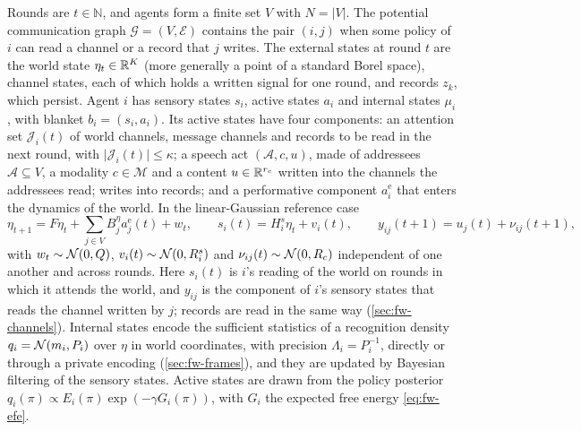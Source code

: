 \begin{definition}\label{def:fw-system}
Rounds are $t\in\mathbb N$, and agents form a finite set $V$ with $N=\lvert V\rvert$. The potential communication graph $\mathcal G=(V,\mathcal E)$ contains the pair $(i,j)$ when some policy of $i$ can read a channel or a record that $j$ writes. The external states at round $t$ are the world state $\eta_t\in\mathbb{R}^K$ (more generally a point of a standard Borel space), channel states, each of which holds a written signal for one round, and records $z_k$, which persist. Agent $i$ has sensory states $s_i$, active states $a_i$ and internal states $\mu_i$, with blanket $b_i=(s_i,a_i)$. Its active states have four components: an attention set $\mathcal J_i(t)$ of world channels, message channels and records to be read in the next round, with $\lvert\mathcal J_i(t)\rvert\le\kappa$; a speech act $(\mathcal A,c,u)$, made of addressees $\mathcal A\subseteq V$, a modality $c\in\mathcal M$ and a content $u\in\mathbb{R}^{r_c}$ written into the channels the addressees read; writes into records; and a performative component $a^{\mathrm e}_i$ that enters the dynamics of the world. In the linear-Gaussian reference case
\begin{equation}\label{eq:fw-world}
\eta_{t+1}=F\eta_t+\sum_{j\in V}B^\eta_ja^{\mathrm e}_j(t)+w_t,\qquad s_i(t)=H^s_i\eta_t+v_i(t),\qquad y_{ij}(t+1)=u_j(t)+\nu_{ij}(t+1),
\end{equation}
with $w_t\sim\mathcal{N}(0,Q)$, $v_i(t)\sim\mathcal{N}(0,R^s_i)$ and $\nu_{ij}(t)\sim\mathcal{N}(0,R_c)$ independent of one another and across rounds. Here $s_i(t)$ is $i$'s reading of the world on rounds in which it attends the world, and $y_{ij}$ is the component of $i$'s sensory states that reads the channel written by $j$; records are read in the same way (\cref{sec:fw-channels}). Internal states encode the sufficient statistics of a recognition density $q_i=\mathcal{N}(m_i,P_i)$ over $\eta$ in world coordinates, with precision $\Lambda_i=P_i^{-1}$, directly or through a private encoding (\cref{sec:fw-frames}), and they are updated by Bayesian filtering of the sensory states. Active states are drawn from the policy posterior $q_i(\pi)\propto E_i(\pi)\exp(-\gamma G_i(\pi))$, with $G_i$ the expected free energy \eqref{eq:fw-efe}.
\end{definition}

